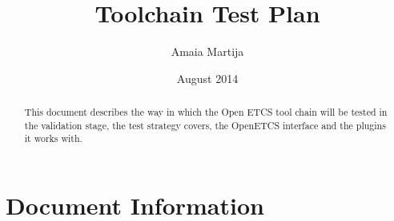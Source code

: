 \documentclass{template/openetcs_report}
\begin{document}
\frontmatter
{}




\title{Toolchain Test Plan}


\date{August 2014}







\author{Amaia Martija}






\begin{abstract}
This document describes the way in which the Open ETCS tool chain will be tested in the validation stage, the test strategy covers, the OpenETCS interface and the plugins it works with.  
\end{abstract}


\maketitle
\tableofcontents

\newpage

\chapter{Document Information}
\end{document}
